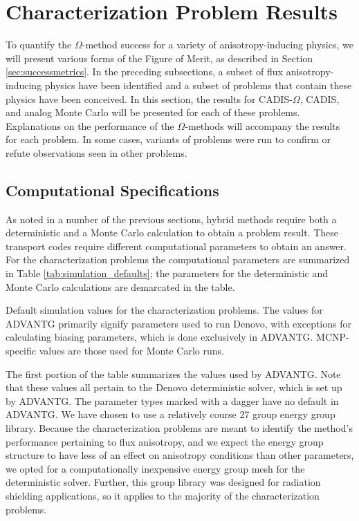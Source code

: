\section{Characterization Problem Results}
\label{sec:CharResults}

To quantify the $\Omega$-method success for a variety of anisotropy-inducing
physics, we will present various forms of the Figure of Merit, as described in
Section \ref{sec:successmetrics}.
In the preceding subsections, a
subset of flux anisotropy-inducing physics have been identified
and a subset of problems that contain these physics have been conceived.
In this section, the results for CADIS-$\Omega$, CADIS, and analog Monte Carlo
will be presented for each of these problems. Explanations on the performance of
the $\Omega$-methods will accompany the results for each problem. In some cases,
variants of problems were run to confirm or refute observations seen
in other problems.

\subsection{Computational Specifications}
\label{subsec:comp_specs}

As noted in a number of the previous sections, hybrid methods require both a
deterministic and a Monte Carlo calculation to obtain a problem result. These
transport codes require different computational parameters to obtain an answer.
For the characterization problems the computational parameters are summarized in
Table \ref{tab:simulation_defaults}; the parameters for the deterministic and
Monte Carlo calculations are demarcated in the table.

\begin{table}[h!]
  \centering
  
  \caption[Default simulation values for characterization problems.]{
    Default simulation values for the characterization problems. The values for
    ADVANTG primarily signify parameters used to run Denovo, with exceptions for
    calculating biasing parameters, which is done exclusively in ADVANTG.
    MCNP-specific values are those used for Monte Carlo runs.
  }
  \label{tab:simulation_defaults}
\end{table}

The first portion of the table summarizes the values used by ADVANTG. Note that
these values all pertain to the Denovo deterministic solver, which is set up by
ADVANTG. The parameter types marked with a dagger have no default in ADVANTG.
We have chosen to use a relatively course 27 group energy group library.
Because the characterization problems are meant to identify the method's
performance pertaining to flux anisotropy, and we expect the energy group
structure to have less of an effect on anisotropy conditions than other
parameters, we opted for a
computationally inexpensive energy group mesh for the deterministic solver.
Further, this group library was designed for radiation shielding applications,
so it applies to the majority of the characterization problems.

